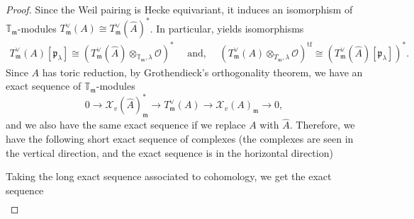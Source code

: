 \documentclass[a4paper, notitlepage, 10pt]{amsart}
\theoremstyle{plain} %
\theoremstyle{definition} %
\theoremstyle{remark} %
\numberwithin{equation}{section}
\newcommand{\bbT}{\mathbb T}
\newcommand{\tf}{\operatorname{tf}} %
\begin{document}
\begin{proof}
    Since the Weil pairing is Hecke equivariant, it induces an isomorphism of $\bbT_{\mathfrak{m}}$-modules $T_{\mathfrak{m}}^\vee(A) \cong T_{\mathfrak{m}}^\vee (\hat{A})^*$. In particular,  yields isomorphisms 
    \begin{align*}
        T^\vee_{\mathfrak{m}}(A)[\mathfrak{p}_\lambda]\cong (T_{\mathfrak{m}}^\vee(\hat{A})\otimes_{\bbT_{\mathfrak{m}},\lambda}\mathcal{O})^* \quad \text{ and, }\quad (T^\vee_{\mathfrak{m}}(A)\otimes_{T_{\mathfrak{m}},\lambda}\mathcal{O})^{\tf}\cong (T^\vee_{\mathfrak{m}}(\hat{A})[\mathfrak{p}_\lambda])^*.
    \end{align*}
    Since $A$ has toric reduction, by Grothendieck's orthogonality theorem, we have an exact sequence of $\bbT_{\mathfrak{m}}$-modules
    $$ 0 \to \mathcal{X}_v(\hat{A})_\mathfrak{m}^*\to T^\vee_{\mathfrak{m}}(A)\to \mathcal{X}_v(A)_{\mathfrak{m}}\to 0, $$
    and we also have the same exact sequence if we replace $A$ with $\hat{A}$. Therefore, we have the following short exact sequence of complexes (the complexes are seen in the vertical direction, and the exact sequence is in the horizontal direction)
    \begin{center}
    \end{center}
    Taking the long exact sequence associated to cohomology, we get the exact sequence
    \begin{align*}

\end{align*}
\end{proof}
\end{document}
